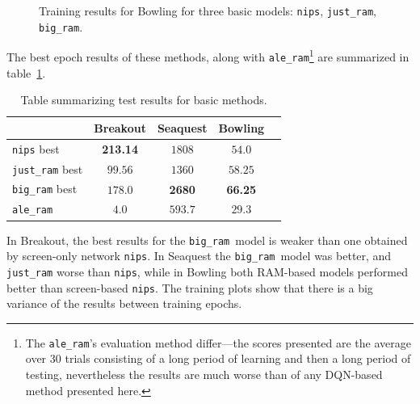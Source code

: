 \begin{figure}[h]
\centering
{}
\caption{Training results for Bowling  for three basic models: \texttt{nips}, \texttt{just\_ram}, \texttt{big\_ram}.}
\label{fig:bowling-plain}
\end{figure}

The best epoch results of these methods, along with \texttt{ale\_ram}\footnote{The \texttt{ale\_ram}'s evaluation method differ---the scores presented are the average over $30$ trials consisting of a long period of learning and then a long period of testing, nevertheless the results are much worse than of any DQN-based method presented here.} are summarized in table~\ref{table:results-plain}.
\begin{table}[h]
\centering
  \begin{tabular}{X c c c c}
  \toprule
  & Breakout & Seaquest & Bowling  \\
  \midrule
  \texttt{nips} best & \textbf{213.14}  & $1808$  & $54.0$  \\
  \texttt{just\_ram} best & $99.56$ & $1360$ & $58.25$  \\
  \texttt{big\_ram} best & $178.0$ & \textbf{2680} & \textbf{66.25} \\
  \texttt{ale\_ram} & $4.0$ & $593.7$ & $29.3$ \\
  \bottomrule
  \end{tabular}
\caption{Table summarizing test results for basic methods.}
\label{table:results-plain}
\end{table}

In Breakout, the best results for the \texttt{big\_ram}~model is weaker than one obtained by screen-only network \texttt{nips}. In Seaquest the \texttt{big\_ram}~model was better, and \texttt{just\_ram} worse than \texttt{nips}, while in Bowling both RAM-based models performed better than screen-based \texttt{nips}.
The training plots show that there is a big variance of the results between training epochs.
